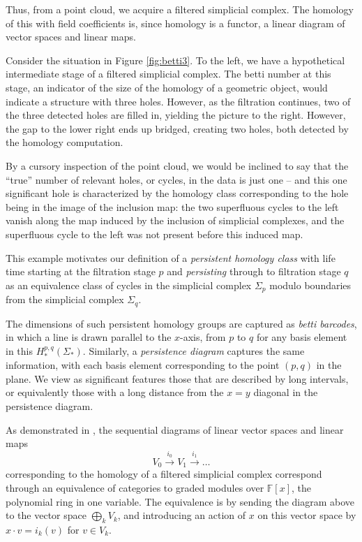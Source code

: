 \documentclass[10pt]{article}
\begin{document}
Thus, from a point cloud, we acquire a filtered simplicial
complex. The homology of this with field coefficients is, since
homology is a functor, a linear diagram of vector spaces and linear
maps. 

Consider the situation in Figure \ref{fig:betti3}. To the left, we
have a hypothetical intermediate stage of a filtered simplicial
complex. The betti number at this stage, an indicator of the size of
the homology of a geometric object, would indicate a structure with
three holes. However, as the filtration continues, two of the three
detected holes are filled in, yielding the picture to the
right. However, the gap to the lower right ends up bridged, creating
two holes, both detected by the homology computation.

By a cursory inspection of the point cloud, we would be inclined to
say that the ``true'' number of relevant holes, or cycles, in the data
is just one -- and this one significant hole is characterized by the
homology class corresponding to the hole being in the image of the
inclusion map: the two superfluous cycles to the left vanish along the
map induced by the inclusion of simplicial complexes, and the
superfluous cycle to the left was not present before this induced
map.

This example motivates our definition of a \emph{persistent homology class}
with life time starting at the filtration stage $p$ and
\emph{persisting} through to filtration stage $q$ as an equivalence
class of cycles in the simplicial complex $\Sigma_p$ modulo boundaries
from the simplicial complex $\Sigma_q$.


The dimensions of such persistent homology groups are captured as
\emph{betti barcodes}, in which a line is drawn parallel to the
$x$-axis, from $p$ to $q$ for any basis element in this
$H^{p,q}_*(\Sigma_*)$. Similarly, a \emph{persistence diagram}
captures the same information, with each basis element corresponding
to the point $(p,q)$ in the plane. We view as significant features
those that are described by long intervals, or equivalently those with
a long distance from the $x=y$ diagonal in the persistence diagram.

As demonstrated in \cite{Carlsson_04}, the sequential diagrams of
linear vector spaces and linear maps
\[
V_0 \xrightarrow{i_0} V_1 \xrightarrow{i_1} \dots 
\]
corresponding to the homology of a filtered simplicial complex
correspond through an equivalence of categories to graded modules over
$\mathbb{F}[x]$, the polynomial ring in one variable. The equivalence
is by sending the diagram above to the vector space $\bigoplus_k V_k$,
and introducing an action of $x$ on this vector space by $x\cdot v=i_k(v)$
for $v\in V_k$.
\end{document}

